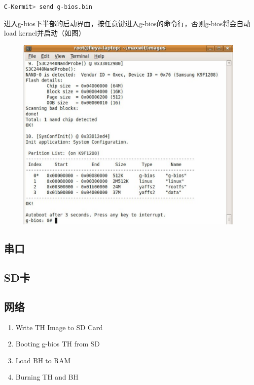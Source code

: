 \begin{lstlisting}[language=bash,numbers=none]
C-Kermit> send g-bios.bin
\end{lstlisting}
进入g-bios下半部的启动界面，按任意键进入g-bios的命令行，否则g-bios将会自动load kernel并启动（如图）

\begin{figure}[H]
\centering
\includegraphics[width=5in]{image/step4.eps}
\end{figure}

\subsection{串口}
\subsection{SD卡}
\subsection{网络}

\begin{enumerate}
\item Write TH Image to SD Card
\item Booting g-bios TH from SD
\item Load BH to RAM
\item Burning TH and BH
\end{enumerate}
